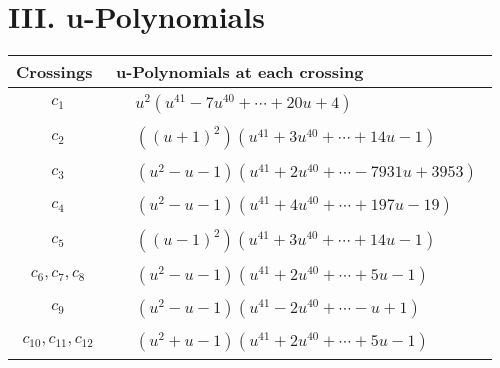 \documentclass[1p]{elsarticle_modified}
\theoremstyle{definition}
\begin{document}
\centering \section*{ III. u-Polynomials}
\begin{tabular}{m{50pt}|m{274pt}}
Crossings & \hspace{64pt}u-Polynomials at each crossing \\
\hline $$\begin{aligned}c_{1}\end{aligned}$$&$\begin{aligned}
&u^2(u^{41}-7 u^{40}+\cdots+20 u+4)
\end{aligned}$\\
\hline $$\begin{aligned}c_{2}\end{aligned}$$&$\begin{aligned}
&((u+1)^2)(u^{41}+3 u^{40}+\cdots+14 u-1)
\end{aligned}$\\
\hline $$\begin{aligned}c_{3}\end{aligned}$$&$\begin{aligned}
&(u^2- u-1)(u^{41}+2 u^{40}+\cdots-7931 u+3953)
\end{aligned}$\\
\hline $$\begin{aligned}c_{4}\end{aligned}$$&$\begin{aligned}
&(u^2- u-1)(u^{41}+4 u^{40}+\cdots+197 u-19)
\end{aligned}$\\
\hline $$\begin{aligned}c_{5}\end{aligned}$$&$\begin{aligned}
&((u-1)^2)(u^{41}+3 u^{40}+\cdots+14 u-1)
\end{aligned}$\\
\hline $$\begin{aligned}c_{6},c_{7},c_{8}\end{aligned}$$&$\begin{aligned}
&(u^2- u-1)(u^{41}+2 u^{40}+\cdots+5 u-1)
\end{aligned}$\\
\hline $$\begin{aligned}c_{9}\end{aligned}$$&$\begin{aligned}
&(u^2- u-1)(u^{41}-2 u^{40}+\cdots- u+1)
\end{aligned}$\\
\hline $$\begin{aligned}c_{10},c_{11},c_{12}\end{aligned}$$&$\begin{aligned}
&(u^2+u-1)(u^{41}+2 u^{40}+\cdots+5 u-1)
\end{aligned}$\\
\hline
\end{tabular}\newpage\renewcommand{\arraystretch}{1}
\end{document}
